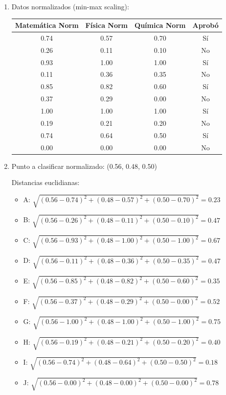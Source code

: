 \documentclass[12pt]{article}
\begin{document}
\begin{enumerate}
    \item Datos normalizados (min-max scaling):
    \begin{table}[H]
        \centering
        \begin{tabular}{cccc}
            \toprule
            \textbf{Matemática Norm} & \textbf{Física Norm} & \textbf{Química Norm} & \textbf{Aprobó} \\
            \midrule
            0.74 & 0.57 & 0.70 & Sí \\
            0.26 & 0.11 & 0.10 & No \\
            0.93 & 1.00 & 1.00 & Sí \\
            0.11 & 0.36 & 0.35 & No \\
            0.85 & 0.82 & 0.60 & Sí \\
            0.37 & 0.29 & 0.00 & No \\
            1.00 & 1.00 & 1.00 & Sí \\
            0.19 & 0.21 & 0.20 & No \\
            0.74 & 0.64 & 0.50 & Sí \\
            0.00 & 0.00 & 0.00 & No \\
            \bottomrule
        \end{tabular}
    \end{table}
    
    \item Punto a clasificar normalizado: (0.56, 0.48, 0.50)
    
    Distancias euclidianas:
    \begin{itemize}
        \item A: $\sqrt{(0.56-0.74)^2 + (0.48-0.57)^2 + (0.50-0.70)^2} = 0.23$
        \item B: $\sqrt{(0.56-0.26)^2 + (0.48-0.11)^2 + (0.50-0.10)^2} = 0.47$
        \item C: $\sqrt{(0.56-0.93)^2 + (0.48-1.00)^2 + (0.50-1.00)^2} = 0.67$
        \item D: $\sqrt{(0.56-0.11)^2 + (0.48-0.36)^2 + (0.50-0.35)^2} = 0.47$
        \item E: $\sqrt{(0.56-0.85)^2 + (0.48-0.82)^2 + (0.50-0.60)^2} = 0.35$
        \item F: $\sqrt{(0.56-0.37)^2 + (0.48-0.29)^2 + (0.50-0.00)^2} = 0.52$
        \item G: $\sqrt{(0.56-1.00)^2 + (0.48-1.00)^2 + (0.50-1.00)^2} = 0.75$
        \item H: $\sqrt{(0.56-0.19)^2 + (0.48-0.21)^2 + (0.50-0.20)^2} = 0.40$
        \item I: $\sqrt{(0.56-0.74)^2 + (0.48-0.64)^2 + (0.50-0.50)^2} = 0.18$
        \item J: $\sqrt{(0.56-0.00)^2 + (0.48-0.00)^2 + (0.50-0.00)^2} = 0.78$
    \end{itemize}
    

\end{enumerate}
\end{document}

